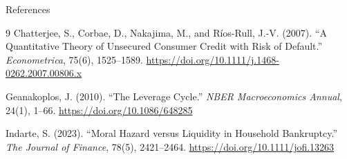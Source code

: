 \documentclass[aspectratio=169]{beamer}
\begin{document}
\begin{frame}{References}
    \footnotesize
    \begin{thebibliography}{9}
        Chatterjee, S., Corbae, D., Nakajima, M., and R\'{i}os-Rull, J.-V. (2007).
        ``A Quantitative Theory of Unsecured Consumer Credit with Risk of Default.''
        \textit{Econometrica}, 75(6), 1525--1589.
        \url{https://doi.org/10.1111/j.1468-0262.2007.00806.x}

        Geanakoplos, J. (2010).
        ``The Leverage Cycle.''
        \textit{NBER Macroeconomics Annual}, 24(1), 1--66.
        \url{https://doi.org/10.1086/648285}

        Indarte, S. (2023).
        ``Moral Hazard versus Liquidity in Household Bankruptcy.''
        \textit{The Journal of Finance}, 78(5), 2421--2464.
        \url{https://doi.org/10.1111/jofi.13263}
    \end{thebibliography}
\end{frame}
\end{document}
